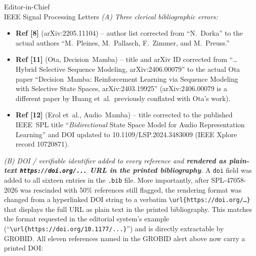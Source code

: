 \documentclass[11pt,a4paper]{letter}
\begin{document}
\begin{letter}{Editor-in-Chief\\
IEEE Signal Processing Letters}
\medskip
\emph{(A) Three clerical bibliographic errors:}
\begin{itemize}\itemsep1pt\parskip0pt
  \item \textbf{Ref [8]} (arXiv:2205.11104) -- author list corrected
        from ``N.~Dorka'' to the actual authors
        ``M.~Pleines, M.~Pallasch, F.~Zimmer, and M.~Preuss.''
  \item \textbf{Ref [11]} (Ota, Decision~Mamba) -- title and arXiv ID
        corrected from ``\ldots Hybrid Selective Sequence Modeling,
        arXiv:2406.00079'' to the actual Ota paper ``Decision~Mamba:
        Reinforcement Learning via Sequence Modeling with Selective
        State Spaces, arXiv:2403.19925'' (arXiv:2406.00079 is a
        different paper by Huang et~al.\ previously conflated with
        Ota's work).
  \item \textbf{Ref [12]} (Erol et~al., Audio~Mamba) -- title corrected
        to the published IEEE~SPL title ``\emph{Bidirectional} State
        Space Model for Audio Representation Learning'' and DOI
        updated to 10.1109/LSP.2024.3483009 (IEEE Xplore record
        10720871).
\end{itemize}

\medskip
\emph{(B) DOI / verifiable identifier added to every reference and
\textbf{rendered as plain-text \texttt{https://doi.org/...} URL in
the printed bibliography}.}
A \texttt{doi} field was added to all sixteen entries in the
\texttt{.bib} file. More importantly, after SPL-47058-2026 was
rescinded with 50\% references still flagged, the rendering format
was changed from a hyperlinked DOI string to a verbatim
\texttt{\textbackslash url\{https://doi.org/\ldots\}} that displays
the full URL as plain text in the printed bibliography. This
matches the format requested in the editorial system's example
(``\texttt{\textbackslash url\{https://doi.org/10.1177/...\}}'') and
is directly extractable by GROBID. All eleven references
named in the GROBID alert above now carry a printed DOI:


\end{letter}
\end{document}
